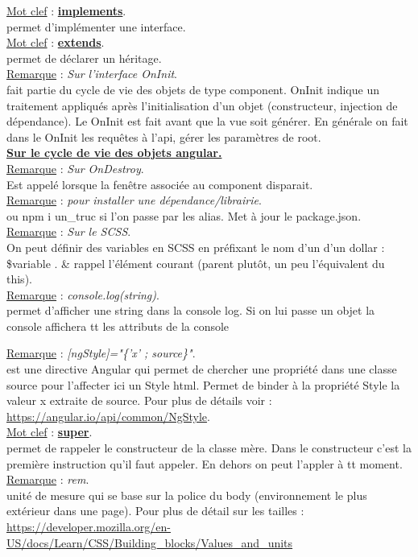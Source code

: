 \documentclass[a4paper,12pt,twoside]{article}
\newcommand{\urlcolor}{magenta}  %
\newcommand{\keycolor}{purple} %
\newcommand{\incode}[1]{{\footnotesize\ttfamily #1}} %
\newcommand{\rem}[2]{\noindent\underline{Remarque} : \textit{#1}.\\ \indent #2}
\newcommand{\keyref}[2]{\hypersetup{urlcolor=\keycolor} \href{#1}{\textbf{#2}}\hypersetup{urlcolor=\urlcolor}}
\newcommand{\keyword}[3]{\noindent\underline{Mot clef} : \keyref{#1}{#2}. \\ \indent #3}
\begin{document}
\keyword{}{implements}{permet d'implémenter une interface.}\\

\keyword{}{extends}{permet de déclarer un héritage.}\\

\rem{Sur l'interface OnInit}{fait partie du cycle de vie des objets de type component. OnInit indique un traitement appliqués après l'initialisation d'un objet (constructeur, injection de dépendance). Le OnInit est fait avant que la vue soit générer. En générale on fait dans le OnInit les requêtes à l'api, gérer les paramètres de root.}\\

\keyref{https://www.cuelogic.com/blog/angular-lifecycle}{Sur le cycle de vie des objets angular.}\\

\rem{Sur OnDestroy}{Est appelé lorsque la fenêtre associée au component disparait. }\\

\rem{pour installer une dépendance/librairie}{\incode{npm install un\_truc} ou \incode{npm i un\_truc} si l'on passe par les alias. Met à jour le package.json.}\\

\rem{Sur le SCSS}{On peut définir des variables en SCSS en préfixant le nom d'un d'un dollar : \$variable . \& rappel l'élément courant (parent plutôt, un peu l'équivalent du this).}\\

\rem{console.log(string)}{permet d'afficher une string dans la console log. Si on lui passe un objet la console affichera tt les attributs de la console}

\rem{[ngStyle]="\{'x' ; source\}"}{ est une directive Angular qui permet de chercher une propriété dans une classe source pour l'affecter ici un Style html. Permet de binder à la propriété Style la valeur x extraite de source. Pour plus de détails voir : \url{https://angular.io/api/common/NgStyle}.}\\

\keyword{}{super}{permet de rappeler le constructeur de la classe mère. Dans le constructeur c'est la première instruction qu'il faut appeler. En dehors on peut l'appler à tt moment.}\\

\rem{rem}{unité de mesure qui se base sur la police du body (environnement le plus extérieur dans une page). Pour plus de détail sur les tailles : \url{https://developer.mozilla.org/en-US/docs/Learn/CSS/Building_blocks/Values_and_units}}\\
\end{document}
